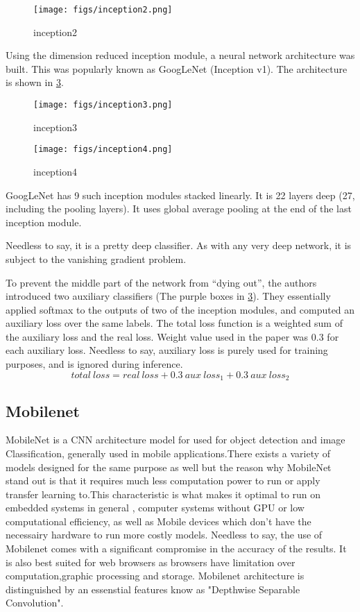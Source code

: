 \begin{figure}[ht]
	\centering
	\texttt{[image: figs/inception2.png]}
	\caption{inception2}\label{fig:inception2}
\end{figure}

Using the dimension reduced inception module, a neural network architecture was built. This was popularly known as GoogLeNet (Inception v1). The architecture is shown in \cref{fig:inception4}.

\begin{figure}[ht]
	\centering
	\texttt{[image: figs/inception3.png]}
	\caption{inception3}\label{fig:inception3}
\end{figure}

\begin{figure}[ht]
	\centering
	\texttt{[image: figs/inception4.png]}
	\caption{inception4}\label{fig:inception4}
\end{figure}

GoogLeNet has 9 such inception modules stacked linearly. It is 22 layers deep (27, including the pooling layers). It uses global average pooling at the end of the last inception module.

Needless to say, it is a pretty deep classifier. As with any very deep network, it is subject to the vanishing gradient problem.

To prevent the middle part of the network from “dying out”, the authors introduced two auxiliary classifiers (The purple boxes in \cref{fig:inception4}). They essentially applied softmax to the outputs of two of the inception modules, and computed an auxiliary loss over the same labels. The total loss function is a weighted sum of the auxiliary loss and the real loss. Weight value used in the paper was 0.3 for each auxiliary loss. Needless to say, auxiliary loss is purely used for training purposes, and is ignored during inference.
$$
total\ loss = real\ loss + 0.3\  aux\ loss_1 + 0.3\  aux\ loss_2
$$

\subsection{Mobilenet}
MobileNet is a CNN architecture model for used for object detection and image Classification, generally used in mobile applications.There exists a variety of models designed for the same purpose as well but the reason why MobileNet stand out is that it requires much less computation power to run or apply transfer learning to.This characteristic is what makes it optimal to run on embedded systems in general , computer systems without GPU or low computational efficiency, as well as Mobile devices which don't have the necessairy hardware to run more costly models. Needless to say, the use of Mobilenet  comes with a significant compromise in the accuracy of the results. It is also best suited for web browsers as browsers have limitation over computation,graphic processing and storage. Mobilenet architecture is distinguished by an essenstial features know as "Depthwise Separable Convolution".

